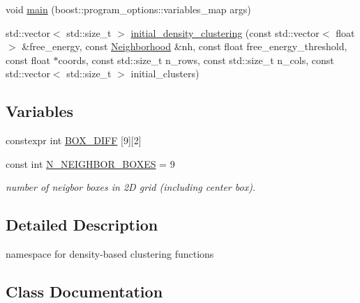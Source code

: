 \begin{DoxyCompactItemize}
\item 
void \hyperlink{namespaceClustering_1_1Density_ad7b2bae0fb60829edfba6b2ef3b1e5b2}{main} (boost\-::program\-\_\-options\-::variables\-\_\-map args)
\item 
std\-::vector$<$ std\-::size\-\_\-t $>$ \hyperlink{namespaceClustering_1_1Density_ad32c63c74da476d94d8e12813d45e750}{initial\-\_\-density\-\_\-clustering} (const std\-::vector$<$ float $>$ \&free\-\_\-energy, const \hyperlink{namespaceClustering_1_1Density_a23a99ccebc9d9cf5c9df6af14559d539}{Neighborhood} \&nh, const float free\-\_\-energy\-\_\-threshold, const float $\ast$coords, const std\-::size\-\_\-t n\-\_\-rows, const std\-::size\-\_\-t n\-\_\-cols, const std\-::vector$<$ std\-::size\-\_\-t $>$ initial\-\_\-clusters)
\end{DoxyCompactItemize}
\subsection*{Variables}
\begin{DoxyCompactItemize}
\item 
constexpr int \hyperlink{namespaceClustering_1_1Density_ab8f90ad24e04bd119fe67c47dee26bf9}{B\-O\-X\-\_\-\-D\-I\-F\-F} \mbox{[}9\mbox{]}\mbox{[}2\mbox{]}
\item 
\hypertarget{namespaceClustering_1_1Density_a9100d8226a5b20341fad7a6a281842c4}{const int \hyperlink{namespaceClustering_1_1Density_a9100d8226a5b20341fad7a6a281842c4}{N\-\_\-\-N\-E\-I\-G\-H\-B\-O\-R\-\_\-\-B\-O\-X\-E\-S} = 9}\label{namespaceClustering_1_1Density_a9100d8226a5b20341fad7a6a281842c4}

\begin{DoxyCompactList}\small\item\em number of neigbor boxes in 2\-D grid (including center box). \end{DoxyCompactList}\end{DoxyCompactItemize}


\subsection{Detailed Description}
namespace for density-\/based clustering functions 

\subsection{Class Documentation}
\label{structClustering_1_1Density_1_1BoxGrid}
\hypertarget{namespaceClustering_1_1Density_structClustering_1_1Density_1_1BoxGrid}{}
